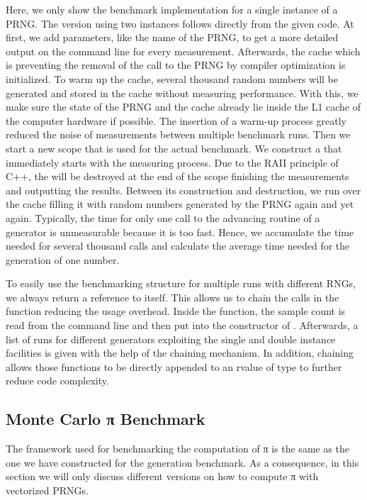 \documentclass{stdlocal}
\begin{document}
    Here, we only show the benchmark implementation for a single instance of a PRNG.
    The version using two instances follows directly from the given code.
    At first, we add  parameters, like the name of the PRNG, to get a more detailed output on the command line for every measurement.
    Afterwards, the cache which is preventing the removal of the call to the PRNG by compiler optimization is initialized.
    To warm up the cache, several thousand random numbers will be generated and stored in the cache without measuring performance.
    With this, we make sure the state of the PRNG and the cache already lie inside the L1 cache of the computer hardware if possible.
    The insertion of a warm-up process greatly reduced the noise of measurements between multiple benchmark runs.
    Then we start a new scope that is used for the actual benchmark.
    We construct a  that immediately starts with the measuring process.
    Due to the RAII principle of C++, the  will be destroyed at the end of the scope finishing the measurements and outputting the results.
    Between its construction and destruction, we run over the cache filling it with random numbers generated by the PRNG again and yet again.
    Typically, the time for only one call to the advancing routine of a generator is unmeasurable because it is too fast.
    Hence, we accumulate the time needed for several thousand calls and calculate the average time needed for the generation of one number.

    To easily use the benchmarking structure for multiple runs with different RNGs, we always return a reference to itself.
    This allows us to chain the calls in the  function reducing the usage overhead.
    Inside the  function, the sample count is read from the command line and then put into the constructor of .
    Afterwards, a list of runs for different generators exploiting the single and double instance facilities is given with the help of the chaining mechanism.
    In addition, chaining allows those functions to be directly appended to an rvalue of type  to further reduce code complexity.

  \subsection{Monte Carlo π Benchmark} %
  \label{sub:monte_carlo_π_benchmark}
    The framework used for benchmarking the computation of π is the same as the one we have constructed for the generation benchmark.
    As a consequence, in this section we will only discuss different versions on how to compute π with vectorized PRNGs.
\end{document}
